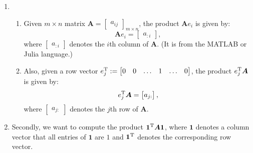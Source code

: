 \begin{enumerate}
\item
\begin{enumerate}
\item
Given $m\times n$ matrix $\bm A = \begin{bmatrix}
a_{ij}
\end{bmatrix}_{m\times n}$, the product $\bm Ae_i$ is given by:
\[
\bm Ae_i = \begin{bmatrix}
a_{:i}
\end{bmatrix},
\]
where $\begin{bmatrix}
a_{:i}
\end{bmatrix}$ denotes the $i$th column of $\bm A$. (It is from the MATLAB or Julia language.)
\item
Also, given a row vector $e_j^{\mathrm T} :=\begin{bmatrix}
0&0& \ldots& 1& \ldots&0
\end{bmatrix}$, the product $e_j^{\mathrm T}\bm A$ is given by:
\[
e_j^{\mathrm T}\bm A = \begin{bmatrix}
a_{j:}
\end{bmatrix},
\]
where $\begin{bmatrix}
a_{j:}
\end{bmatrix}$ denotes the $j$th row of $\bm A$.
\end{enumerate}
\item
Secondly, we want to compute the product $\bm 1^{\mathrm T}\bm A\bm 1$, where $\bm 1$ denotes a column vector that all entries of $\bm 1$ are $1$ and $\bm 1^{\mathrm T}$ denotes the corresponding row vector.


\end{enumerate}
